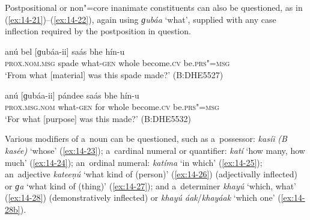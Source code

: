 Postpositional or non"=core inanimate constituents can also be questioned, as in (\ref{ex:14-21})--(\ref{ex:14-22}), again using \textit{ɡubáa} `what', supplied with any case inflection required by the postposition in question.

\begin{exe}
\ex
\label{ex:14-21}
\gll anú bel [ɡubáa-ii] saás bhe hín-u  \\
\textsc{prox.nom.msg} spade what-\textsc{gen} whole become.\textsc{cv}  be.\textsc{prs"=msg} \\
\glt `From what [material] was this spade made?' (B:DHE5527)

\ex
\label{ex:14-22}
\gll anú [ɡubáa-ii] pándee saás bhe  hín-u \\
\textsc{prox.msg.nom} what-\textsc{gen} for whole become.\textsc{cv}  be.\textsc{prs"=msg} \\
\glt `For what [purpose] was this made?' (B:DHE5532)
\end{exe}

 Various modifiers of a~noun can be questioned,
such as a~possessor: \textit{kasíi} \textit{(B kasée)} `whose' (\ref{ex:14-23});
a~cardinal numeral or quantifier: \textit{katí} `how many, how much' (\ref{ex:14-24});
an~ordinal numeral: \textit{katíma} `in which' (\ref{ex:14-25}); an~adjective
\textit{kateeṇú} `what kind of (person)' (\ref{ex:14-26}) (adjectivally inflected) or
\textit{ɡa} `what kind of (thing)' (\ref{ex:14-27}); and a~determiner \textit{khayú} `which,
what' (\ref{ex:14-28}) (demonstratively inflected) or \textit{khayú áak}/\textit{khayáak} `which one' (\ref{ex:14-28b}).

